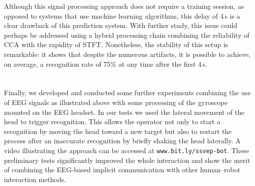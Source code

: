 \documentclass[smallextended]{svjour3}
\begin{document}
Although this signal processing approach does not require a training session, as opposed to systems that use machine learning algorithms, this delay of 4\,s is a clear drawback of this prediction system. 
With further study, this issue could perhaps be addressed using a hybrid processing chain combining the reliability of CCA with the rapidity of STFT.
Nonetheless, the stability of this setup is remarkable: it shows that despite the numerous artifacts, it is possible to achieve, on average, a recognition rate of 75\% at any time after the first 4\,s. \\
\\
\\
Finally, we developed and conducted some further experiments combining the use of EEG signals as illustrated above with some processing of the gyroscope mounted on the EEG headset. 
In our tests we used the lateral movement of the head to trigger recognition. 
This allows the operator not only to start a recognition by moving the head toward a new target but also to restart the process after an inaccurate recognition by briefly shaking the head laterally. 
A video illustrating the approach can be accessed at \verb"www.bit.ly/ssvep-bot". 
These preliminary tests significantly improved the whole interaction and show the merit of combining the EEG-based implicit communication with other human--robot interaction methods.
\end{document}
